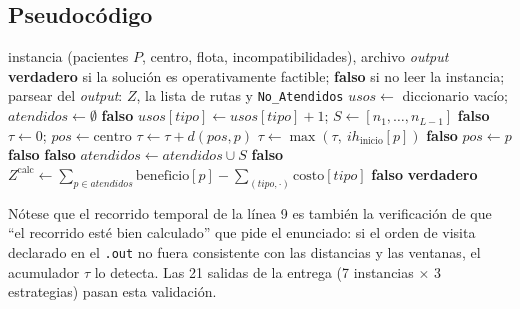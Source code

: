 \documentclass[12pt]{article}
\numberwithin{algorithm}{section}
\begin{document}
\subsection*{Pseudocódigo}

\begin{algorithm}[H]
\caption{\textsc{SaludTest} --- validación de factibilidad sin programación lineal}
\label{alg:saludtest}
\begin{algorithmic}[1]
\Require instancia (pacientes $P$, centro, flota, incompatibilidades), archivo \emph{output}
\Ensure \textbf{verdadero} si la solución es operativamente factible; \textbf{falso} si no
\State leer la instancia; parsear del \emph{output}: $Z$, la lista de rutas y \texttt{No\_Atendidos}
\State $\mathit{usos} \gets$ diccionario vacío; $\mathit{atendidos} \gets \emptyset$
        \Return \textbf{falso} 
    \EndIf
    \State $\mathit{usos}[\mathit{tipo}] \gets \mathit{usos}[\mathit{tipo}] + 1$;
        $S \gets [n_1, \ldots, n_{L-1}]$
     \Return \textbf{falso} 
    \EndIf
    \State $\tau \gets 0$; $\mathit{pos} \gets \text{centro}$
        \State $\tau \gets \tau + d(\mathit{pos}, p)$ 
        \State $\tau \gets \max(\tau,\ ih_{\text{inicio}}[p])$ 
         \Return \textbf{falso} 
        \EndIf
        \State $\mathit{pos} \gets p$
    \EndFor
            \Return \textbf{falso} 
        \EndIf
    \EndFor
     \Return \textbf{falso} 
    \EndIf
    \State $\mathit{atendidos} \gets \mathit{atendidos} \cup S$
\EndFor
{}
     \Return \textbf{falso} 
    \EndIf
\EndFor
\State $Z^{\text{calc}} \gets \sum_{p \in \mathit{atendidos}} \text{beneficio}[p] - \sum_{(\mathit{tipo}, \cdot)} \text{costo}[\mathit{tipo}]$
    \Return \textbf{falso} 
\EndIf
\State \Return \textbf{verdadero}
\end{algorithmic}
\end{algorithm}

Nótese que el recorrido temporal de la línea 9 es también la verificación de que ``el recorrido
esté bien calculado'' que pide el enunciado: si el orden de visita declarado en el
\texttt{.out} no fuera consistente con las distancias y las ventanas, el acumulador $\tau$ lo
detecta. Las 21 salidas de la entrega (7 instancias $\times$ 3 estrategias) pasan esta
validación.

\newpage
\end{document}
